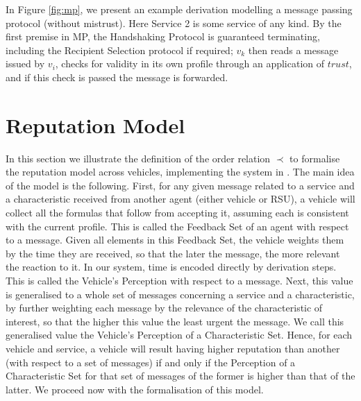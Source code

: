 \documentclass[compsoc, conference, letterpaper, 10pt, times]{IEEEtran}
\begin{document}

In Figure \ref{fig:mp}, we present an example derivation modelling a message passing protocol (without mistrust). Here Service 2 is some service of any kind. By the first premise in MP, the Handshaking Protocol is guaranteed terminating, including the Recipient Selection protocol if required; $v_{k}$ then reads a message issued by $v_{i}$, checks for validity in its own profile through an application of $trust$, and if this check is passed the message is forwarded.



\begin{figure*}
	\begin{prooftree}
		\end{prooftree}

	\caption{The Message Passing Protocol}\label{fig:mp}
\end{figure*}



\section{Reputation Model}\label{sec:reputation}

In this section we illustrate the definition of the order relation $\prec$ to formalise the reputation model across vehicles, implementing the system in \cite{glenford}. The main idea of the model is the following. First, for any given message related to a service and a characteristic received from another agent (either vehicle or RSU), a vehicle will collect all the formulas that follow from accepting it, assuming each is consistent with the current profile. This is called the Feedback Set of an agent with respect to a message. Given all elements in this Feedback Set, the vehicle weights them by the time they are received, so that the later the message, the more relevant the reaction to it. In our system, time is encoded directly by derivation steps. This is called the Vehicle's Perception with respect to a message. Next, this value is generalised to a whole set of messages concerning a service and a characteristic, by further weighting each message by the relevance of the characteristic of interest, so that the higher this value the least urgent the message. We call this generalised value the Vehicle's Perception of a Characteristic Set. Hence, for each vehicle and service, a vehicle will result having higher reputation than another (with respect to a set of messages) if and only if the Perception of a Characteristic Set for that set of messages of the former is higher than that of the latter. We proceed now with the formalisation of this model.
\end{document}
